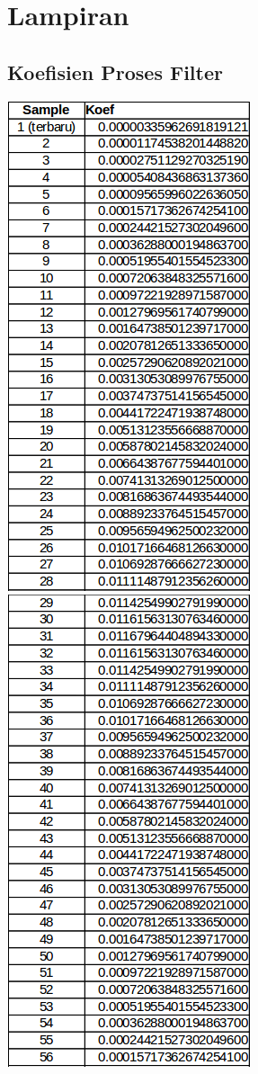 \chapter*{Lampiran}

\section{Koefisien Proses Filter}\label{lampiran:bandpass}
\begin{table}[htbp]
	\includegraphics[scale=0.6]{images/koef1.png}
	\includegraphics[scale=0.6]{images/koef2.png}

\end{table}
